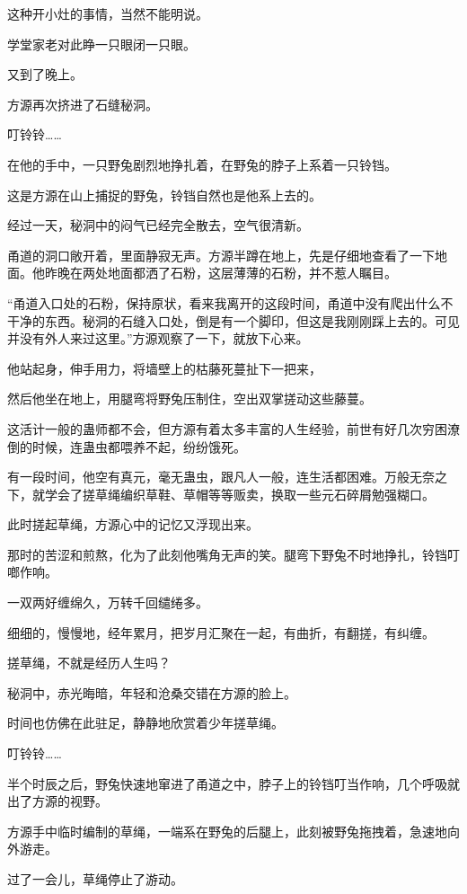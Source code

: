 \begin{this_body}
这种开小灶的事情，当然不能明说。

学堂家老对此睁一只眼闭一只眼。

又到了晚上。

方源再次挤进了石缝秘洞。

叮铃铃……

在他的手中，一只野兔剧烈地挣扎着，在野兔的脖子上系着一只铃铛。

这是方源在山上捕捉的野兔，铃铛自然也是他系上去的。

经过一天，秘洞中的闷气已经完全散去，空气很清新。

甬道的洞口敞开着，里面静寂无声。方源半蹲在地上，先是仔细地查看了一下地面。他昨晚在两处地面都洒了石粉，这层薄薄的石粉，并不惹人瞩目。

“甬道入口处的石粉，保持原状，看来我离开的这段时间，甬道中没有爬出什么不干净的东西。秘洞的石缝入口处，倒是有一个脚印，但这是我刚刚踩上去的。可见并没有外人来过这里。”方源观察了一下，就放下心来。

他站起身，伸手用力，将墙壁上的枯藤死蔓扯下一把来，

然后他坐在地上，用腿弯将野兔压制住，空出双掌搓动这些藤蔓。

这活计一般的蛊师都不会，但方源有着太多丰富的人生经验，前世有好几次穷困潦倒的时候，连蛊虫都喂养不起，纷纷饿死。

有一段时间，他空有真元，毫无蛊虫，跟凡人一般，连生活都困难。万般无奈之下，就学会了搓草绳编织草鞋、草帽等等贩卖，换取一些元石碎屑勉强糊口。

此时搓起草绳，方源心中的记忆又浮现出来。

那时的苦涩和煎熬，化为了此刻他嘴角无声的笑。腿弯下野兔不时地挣扎，铃铛叮啷作响。

一双两好缠绵久，万转千回缱绻多。

细细的，慢慢地，经年累月，把岁月汇聚在一起，有曲折，有翻搓，有纠缠。

搓草绳，不就是经历人生吗？

秘洞中，赤光晦暗，年轻和沧桑交错在方源的脸上。

时间也仿佛在此驻足，静静地欣赏着少年搓草绳。

叮铃铃……

半个时辰之后，野兔快速地窜进了甬道之中，脖子上的铃铛叮当作响，几个呼吸就出了方源的视野。

方源手中临时编制的草绳，一端系在野兔的后腿上，此刻被野兔拖拽着，急速地向外游走。

过了一会儿，草绳停止了游动。


\end{this_body}
